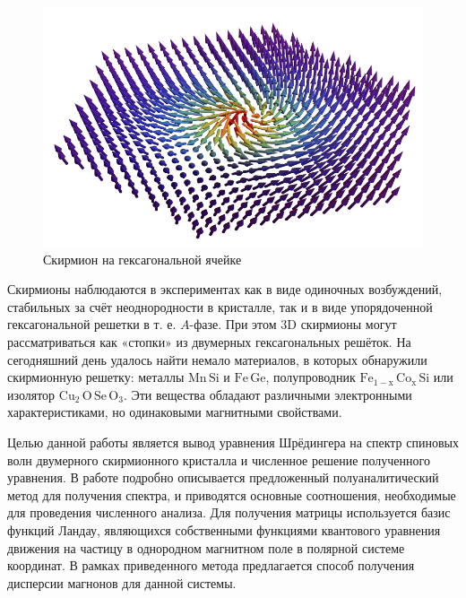\documentclass[a4paper,article,14pt]{extarticle}
\begin{document}
\begin{figure}[h]
	\centering
	\includegraphics[width=0.5\paperwidth]{images/skyrmionPic.png}
	\caption{Скирмион на гексагональной ячейке}
	\label{pic:skyrmion}
\end{figure}

Скирмионы наблюдаются в экспериментах как в виде одиночных возбуждений, стабильных за счёт неоднородности в кристалле\cite{rosch_muller}, так и в виде упорядоченной гексагональной решетки в т. е. $A$-фазе. \cite{mulhbauer} При этом 3D скирмионы могут рассматриваться как «стопки» из двумерных гексагональных решёток.\cite{milde, Rybakov2015}
На сегодняшний день удалось найти немало материалов, в которых обнаружили скирмионную решетку: металлы $\mathrm{Mn\,Si}$ и $\mathrm{Fe\,Ge}$, полупроводник $\mathrm{Fe_{1-x}\,Co_x\,Si}$ \cite{munzer} или изолятор $\mathrm{Cu_2\,O\, Se\, O_3}$. Эти вещества обладают различными электронными характеристиками, но одинаковыми магнитными свойствами. \cite{nagaosa}


Целью данной работы является вывод уравнения Шрёдингера на спектр спиновых волн двумерного скирмионного кристалла и численное решение полученного уравнения. В работе подробно описывается предложенный полуаналитический метод для получения спектра, и приводятся основные соотношения, необходимые для проведения численного анализа. Для получения матрицы используется базис функций Ландау, являющихся собственными функциями квантового уравнения движения на частицу в однородном магнитном поле в полярной системе координат. В рамках приведенного метода предлагается способ получения дисперсии магнонов для данной системы.

\end{document}
